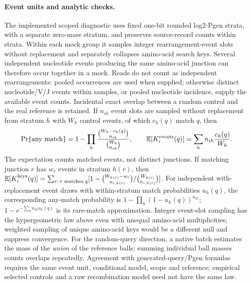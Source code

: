 \documentclass[10pt,a4paper]{article}
\theoremstyle{definition}
\newcommand{\E}{\mathbb{E}}
\begin{document}
\paragraph{Event units and analytic checks.}
The implemented scoped diagnostic uses fixed one-bit rounded log2-Pgen strata, with a separate zero-mass stratum, and preserves source-record counts within strata.
Within each mock group it samples integer rearrangement-event slots without replacement and separately collapses amino-acid search keys.
Several independent nucleotide events producing the same amino-acid junction can therefore occur together in a mock.
Reads do not count as independent rearrangements: pooled occurrences are used when supplied; otherwise distinct nucleotide/V/J events within samples, or pooled nucleotide incidence, supply the available event counts.
Incidental exact overlap between a random control and the real reference is retained.
If $n_{ih}$ event slots are sampled without replacement from stratum $h$ with $W_h$ control events, of which $c_h(q)$ match $q$, then
\[
 \Pr\{\text{any match}\}=1-\prod_h\frac{\binom{W_h-c_h(q)}{n_{ih}}}{\binom{W_h}{n_{ih}}},
 \qquad \E[K_i^{\rm events}(q)]=\sum_h n_{ih}\frac{c_h(q)}{W_h}.
\]
The expectation counts matched events, not distinct junctions.
If matching junction $r$ has $w_r$ events in stratum $h(r)$, then
$\E[K_i^{\rm keys}(q)]=\sum_{r:\,r\text{ matches }q}[1-\binom{W_{h(r)}-w_r}{n_{i,h(r)}}/\binom{W_{h(r)}}{n_{i,h(r)}}]$.
For independent with-replacement event draws with within-stratum match probabilities $u_h(q)$, the corresponding any-match probability is
$1-\prod_h(1-u_h(q))^{n_{ih}}$; $1-e^{-\sum_hn_{ih}u_h(q)}$ is its rare-match approximation.
Integer event-slot sampling has the hypergeometric law above even with unequal amino-acid multiplicities; weighted sampling of unique amino-acid keys would be a different null and suppress convergence.
For the random-query direction, a native batch estimates the mass of the \emph{union} of the reference balls; summing individual ball masses counts overlaps repeatedly.
Agreement with generated-query/Pgen formulas requires the same event unit, conditional model, scope and reference; empirical selected controls and a raw recombination model need not have the same law.
\end{document}
